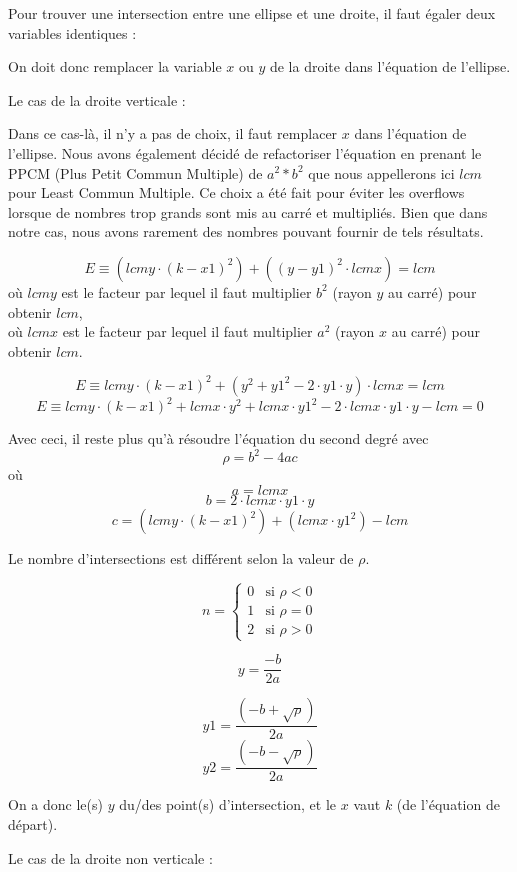 \documentclass[]{report}
\begin{document}
Pour trouver une intersection entre une ellipse
et une droite, il faut égaler deux variables 
identiques :

On doit donc remplacer la variable $x$ ou $y$ de la droite dans
l'équation de l'ellipse.

Le cas de la droite verticale : 

Dans ce cas-là, il n'y a pas de choix, il faut remplacer
$x$ dans l'équation de l'ellipse.
Nous avons également décidé de refactoriser l'équation en 
prenant le PPCM (Plus Petit Commun Multiple) de $a^2 * b^2$ que
nous appellerons ici $lcm$ pour Least Commun Multiple.
Ce choix a été fait pour éviter les overflows lorsque 
de nombres trop grands sont mis au carré et multipliés.
Bien que dans notre cas, nous avons rarement des nombres
pouvant fournir de tels résultats.

$$ E \equiv (lcmy \cdot (k - x1)^2) + ((y - y1)^2 \cdot lcmx) = lcm $$  
où $lcmy$ est le facteur par lequel il faut multiplier
$b^2$ (rayon $y$ au carré) pour obtenir $lcm$, \\
où $lcmx$ est le facteur par lequel il faut multiplier
$a^2$ (rayon $x$ au carré) pour obtenir $lcm$.

$$ E \equiv lcmy \cdot (k-x1)^2 + (y^2 + y1^2 - 2 \cdot y1 \cdot y)
\cdot lcmx = lcm$$
$$ E \equiv lcmy \cdot (k-x1)^2 + lcmx \cdot y^2 + lcmx \cdot
y1^2 - 2 \cdot lcmx \cdot y1 \cdot y - lcm = 0 $$

Avec ceci, il reste plus qu'à résoudre l'équation du second degré 
avec 
$$ \rho = b^2 - 4ac$$
où $$ a = lcmx $$
$$ b = 2 \cdot lcmx \cdot y1 \cdot y $$
$$ c = (lcmy \cdot (k-x1)^2) + (lcmx \cdot y1^2) - lcm $$



Le nombre d'intersections est différent selon la valeur de $\rho$.

\[
	n =
	\begin{cases}
		0 & \text{si } \rho < 0 \\
		1 & \text{si } \rho = 0 \\
		2 & \text{si } \rho > 0  
	\end{cases}
\]

$$ y = \frac {-b}{2a} $$

$$ y1 = \frac{(-b + \sqrt{\rho})}{2a} $$
$$ y2 = \frac{(-b - \sqrt{\rho})}{2a} $$

On a donc le(s) $y$ du/des point(s) d'intersection, et le $x$
vaut $k$ (de l'équation de départ).



Le cas de la droite non verticale : 
\end{document}

